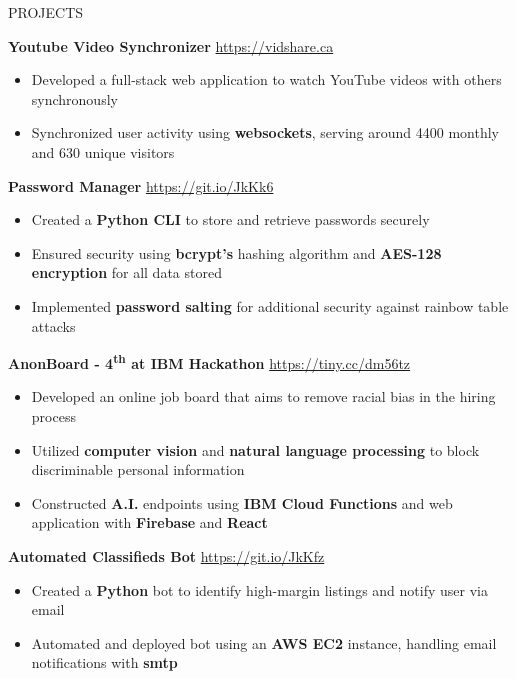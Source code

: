 \documentclass[letterpaper,11pt,oneside]{article}
\newcommand{\createHeading}[1]{
    \vspace{1.25em}
    \hline
    \vspace{-1.5ex}
    \begin{center}
        #1
    \end{center}
    \vspace{-1.5ex}
    \hline
    \vspace{1.25em}
}
\begin{document}
\createHeading{PROJECTS}
\begin{addmargin}[.6em]{.6em}
    \textbf{Youtube Video Synchronizer} \hfill \href{https://vidshare.ca}{https://vidshare.ca}
    \begin{itemize}
        \item Developed a full-stack web application to watch YouTube videos with others synchronously
        \item Synchronized user activity using \textbf{websockets}, serving around 4400 monthly and 630 unique visitors
    \end{itemize}
    \vspace{1.25em}
    \textbf{Password Manager} \hfill \href{https://git.io/JkKk6}{https://git.io/JkKk6}
    \begin{itemize}
        \item Created a \textbf{Python CLI} to store and retrieve passwords securely 
        \item Ensured security using \textbf{bcrypt's} hashing algorithm and \textbf{AES-128 encryption} for all data stored
        \item Implemented \textbf{password salting} for additional security against rainbow table attacks
    \end{itemize}
    \vspace{1.25em}
    \textbf{AnonBoard - 4\textsuperscript{th} at IBM Hackathon} \hfill \href{https://tiny.cc/dm56tz}{https://tiny.cc/dm56tz}
    \begin{itemize}
        \item Developed an online job board that aims to remove racial bias in the hiring process
        \item Utilized \textbf{computer vision} and \textbf{natural language processing} to block discriminable personal information
        \item Constructed \textbf{A.I.} endpoints using \textbf{IBM Cloud Functions} and web application with \textbf{Firebase} and \textbf{React}
    \end{itemize}
    \vspace{1.25em}
    \textbf{Automated Classifieds Bot} \hfill \href{https://git.io/JkKfz}{https://git.io/JkKfz}
    \begin{itemize}
        \item Created a \textbf{Python} bot to identify high-margin listings and notify user via email
        \item Automated and deployed bot using an \textbf{AWS EC2} instance, handling email notifications with \textbf{smtp}

\end{itemize}
\end{addmargin}
\end{document}
